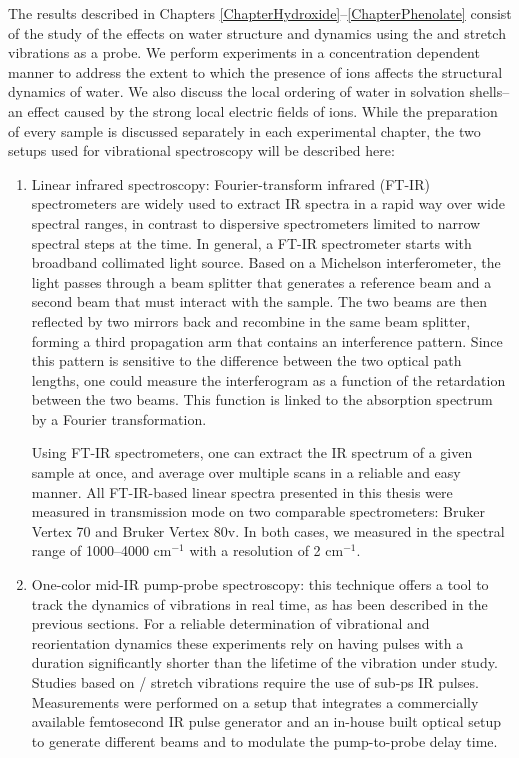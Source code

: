 The results described in Chapters \ref{ChapterHydroxide}--\ref{ChapterPhenolate} consist of the study of the effects on water structure and dynamics using the  and  stretch vibrations as a probe. We perform experiments in a concentration dependent manner to address the extent to which the presence of ions affects the structural dynamics of water. We also discuss the local ordering of water in solvation shells--an effect caused by the strong local electric fields of ions. While the preparation of every sample is discussed separately in each experimental chapter, the two setups used for vibrational spectroscopy will be described here:

\begin{enumerate}
	
	\item {Linear infrared spectroscopy: Fourier-transform infrared (FT-IR) spectrometers are widely used to extract IR spectra in a rapid way over wide spectral ranges, in contrast to dispersive spectrometers limited to narrow spectral steps at the time.\!\cite{Griffiths2006} In general, a FT-IR spectrometer starts with broadband collimated light source. Based on a Michelson interferometer, the light passes through a beam splitter that generates a reference beam and a second beam that must interact with the sample. The two beams are then reflected by two mirrors back and recombine in the same beam splitter, forming a third propagation arm that contains an interference pattern. Since this pattern is sensitive to the difference between the two optical path lengths, one could measure the interferogram as a function of the retardation between the two beams. This function is linked to the absorption spectrum by a Fourier transformation.\!\cite{Griffiths2006}
	
	Using FT-IR spectrometers, one can extract the IR spectrum of a given sample at once, and average over multiple scans in a reliable and easy manner. All FT-IR-based linear spectra presented in this thesis were measured in transmission mode on two comparable spectrometers: Bruker Vertex 70 and Bruker Vertex 80v. In both cases, we measured in the spectral range of 1000--4000 cm$^{-1}$ with a resolution of 2 cm$^{-1}$.}
	
	\item{One-color mid-IR pump-probe spectroscopy: this technique offers a tool to track the dynamics of vibrations in real time, as has been described in the previous sections. For a reliable determination of vibrational and reorientation dynamics these experiments rely on having pulses with a duration significantly shorter than the lifetime of the vibration under study. Studies based on / stretch vibrations require the use of sub-ps IR pulses. Measurements were performed on a setup that integrates a commercially available femtosecond IR pulse generator and an in-house built optical setup to generate different beams and to modulate the pump-to-probe delay time.}
\end{enumerate}




